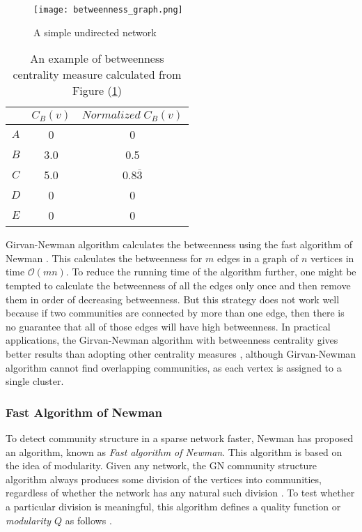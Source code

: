 \begin{figure}[H]
	\centering
	\texttt{[image: betweenness\_graph.png]}
	\caption{A simple undirected network}
	\label{betweenness_graph}
\end{figure}

\begin{table}[!h]
	\centering
	\begin{tabular}{|c | c | c |}
		\cline{2-3}\multicolumn{1}{c|}{} 
		& 		$C_{B}(v)$	& $Normalized \; C_{B}(v)$ \\\hline 
		$A$		& 0 		& 0 						\\\hline 
		$B$ 	& 3.0		& 0.5 						\\\hline 
		$C$ 	& 5.0		& 0.8$\overline{3}$ 		\\\hline 
		$D$ 	& 0 		& 0							\\\hline 
		$E$ 	& 0 		& 0 						\\\hline 
	\end{tabular}
	\caption{An example of betweenness centrality measure calculated from Figure (\ref{betweenness_graph})}
\end{table}

Girvan-Newman algorithm calculates the betweenness using the fast algorithm of Newman \cite{ref-1, ref-13}. This calculates the betweenness for $m$ edges in a graph of $n$ vertices in time $\mathcal{O}(mn)$. To reduce the running time of the algorithm further, one might be tempted to calculate the betweenness of all the edges only once and then remove them in order of decreasing betweenness. But this strategy does not work well because if two communities are connected by more than one edge, then there is no guarantee that all of those edges will have high betweenness. In practical applications, the Girvan-Newman algorithm with betweenness centrality gives better results than adopting other centrality measures \cite{ref-12}, although Girvan-Newman algorithm cannot find overlapping communities, as each vertex is assigned to a single cluster.

\subsubsection*{Fast Algorithm of Newman}\label{sub:fastalgorithm}
To detect community structure in a sparse network faster, Newman has proposed an algorithm, known as \textit{Fast algorithm of Newman}. This algorithm is based on the idea of modularity. Given any network, the GN community structure algorithm \cite{ref-1} always produces some division of the vertices into communities, regardless of whether the network has any natural such division \cite{ref-13}. To test whether a particular division is meaningful, this algorithm defines a quality function or\textit{ modularity $Q$} as follows \cite{ref-1}.

